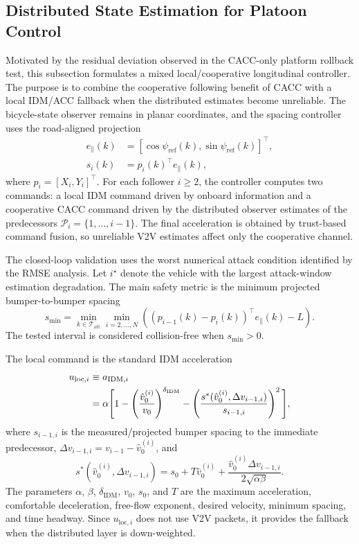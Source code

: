 \documentclass[journal,twoside]{IEEEtran}
\begin{document}
\subsection{Distributed State Estimation for Platoon Control}
Motivated by the residual deviation observed in the CACC-only platform rollback test, this subsection formulates a mixed local/cooperative longitudinal controller. The purpose is to combine the cooperative following benefit of CACC with a local IDM/ACC fallback when the distributed estimates become unreliable. The bicycle-state observer remains in planar coordinates, and the spacing controller uses the road-aligned projection
\begin{align}
    e_{\parallel}(k)&=[\cos\psi_{\mathrm{ref}}(k),\sin\psi_{\mathrm{ref}}(k)]^\top,\\
    s_i(k)&=p_i(k)^\top e_{\parallel}(k),
\end{align}
where $p_i=[X_i,Y_i]^\top$. For each follower $i\ge2$, the controller computes two commands: a local IDM command driven by onboard information and a cooperative CACC command driven by the distributed observer estimates of the predecessors $\mathcal{P}_i=\{1,\ldots,i-1\}$. The final acceleration is obtained by trust-based command fusion, so unreliable V2V estimates affect only the cooperative channel.

The closed-loop validation uses the worst numerical attack condition identified by the RMSE analysis. Let $i^\star$ denote the vehicle with the largest attack-window estimation degradation. The main safety metric is the minimum projected bumper-to-bumper spacing
\begin{equation}
    s_{\min}=\min_{k\in\mathcal{T}_{\mathrm{att}}}\min_{i=2,\ldots,N}
    \left((p_{i-1}(k)-p_i(k))^\top e_{\parallel}(k)-L\right).
\end{equation}
The tested interval is considered collision-free when $s_{\min}>0$.

The local command is the standard IDM acceleration
\begin{align}
    u_{\mathrm{loc},i}
    &\equiv a_{\text{IDM},i} \notag\\
    &=\alpha\Bigg[
    1-\left(\frac{\hat{v}_0^{(i)}}{v_0}\right)^{\delta_{\mathrm{IDM}}}
    -\left(\frac{s^*(\hat{v}_0^{(i)},\Delta v_{i-1,i})}{s_{i-1,i}}\right)^2
    \Bigg],
\end{align}
where $s_{i-1,i}$ is the measured/projected bumper spacing to the immediate predecessor, $\Delta v_{i-1,i}=v_{i-1}-\hat{v}_0^{(i)}$, and
\begin{equation}
    s^*(\hat{v}_0^{(i)},\Delta v_{i-1,i})=s_0+T\hat{v}_0^{(i)}+\frac{\hat{v}_0^{(i)}\Delta v_{i-1,i}}{2\sqrt{\alpha\beta}}.
\end{equation}
The parameters $\alpha$, $\beta$, $\delta_{\mathrm{IDM}}$, $v_0$, $s_0$, and $T$ are the maximum acceleration, comfortable deceleration, free-flow exponent, desired velocity, minimum spacing, and time headway. Since $u_{\mathrm{loc},i}$ does not use V2V packets, it provides the fallback when the distributed layer is down-weighted.
\end{document}
